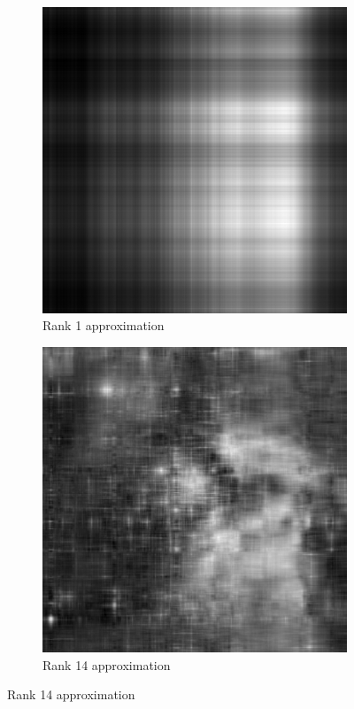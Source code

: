 \begin{figure}
\centering
\begin{subfigure}[b]{.49\textwidth}
\centering
\includegraphics[width=\textwidth]{rank1.png}
\caption{Rank 1 approximation}
\end{subfigure}
\begin{subfigure}[b]{.49\textwidth}
\centering
\includegraphics[width=\textwidth]{rank14.png}
\caption{Rank 14 approximation}
\end{subfigure}


\end{figure}
